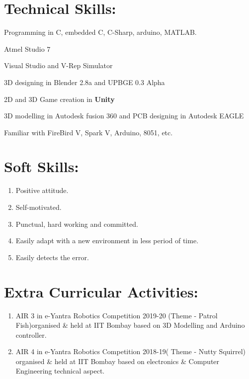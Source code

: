 \documentclass[margin,line]{res}
\begin{document}
\begin{resume}
{\section{\Large\bf{Technical Skills:}}}
\begin{enumerate}
\vspace{0.5cm}
	\item{Programming in C, embedded C, C-Sharp,  arduino, MATLAB.}	
\item {
Atmel Studio 7}
\item {
Visual Studio and V-Rep Simulator
\item {
 3D designing in Blender 2.8a and  UPBGE 0.3 Alpha}
 \item{
 2D and 3D Game creation in \textbf{Unity}
 }
 \item{
 3D modelling in Autodesk fusion 360 and PCB designing in Autodesk EAGLE
 }
 \item{
 Familiar with FireBird V, Spark V, Arduino, 8051, etc.
 }
}
\end{enumerate}
\hfill






{\section{\Large\bf{Soft Skills:}}}
\begin{enumerate}
	\item{Positive attitude.}
	\item{Self-motivated.}
	\item{Punctual, hard working and committed.}
\item Easily adapt with a new environment in less period of time.
\item Easily detects the error.	
\end{enumerate}
\hfill




{\section{\Large\bf{Extra Curricular Activities:}}}
\begin{enumerate}
	\item{AIR 3 in e-Yantra Robotics Competition 2019-20 (Theme - Patrol Fish)organised & held at IIT Bombay based on 3D Modelling and Arduino controller.
}
\item{AIR 4 in e-Yantra Robotics Competition 2018-19( Theme - Nutty Squirrel) organised & held at IIT Bombay based on electronics & Computer Engineering technical aspect.}


\end{enumerate}
\end{resume}
\end{document}
